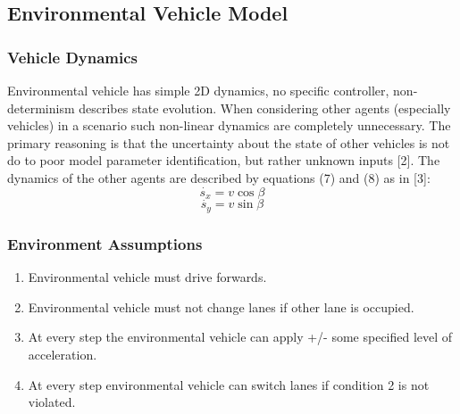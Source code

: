 \subsection{Environmental Vehicle Model}
\label{caseStudyEnv}
\subsubsection{Vehicle Dynamics}
Environmental vehicle has simple 2D dynamics, no specific controller, non-determinism describes state evolution. When considering other agents (especially vehicles) in a scenario such non-linear dynamics are completely unnecessary. The primary reasoning is that the uncertainty about the state of other vehicles is not do to poor model parameter identification, but rather unknown inputs [2]. The dynamics of the other agents are described by equations (7) and (8) as in [3]:
\begin{equation}
\dot{s_x}=v\cos{\beta}
\end{equation}
\begin{equation}
\dot{s_y}=v\sin{\beta}
\end{equation}

\subsubsection{Environment Assumptions}
\begin{enumerate}
	\item Environmental vehicle must drive forwards.
	\item Environmental vehicle must not change lanes if other lane is occupied.
	\item At every step the environmental vehicle can apply +/- some specified level of acceleration.
	\item At every step environmental vehicle can switch lanes if condition 2 is not violated.
\end{enumerate}
